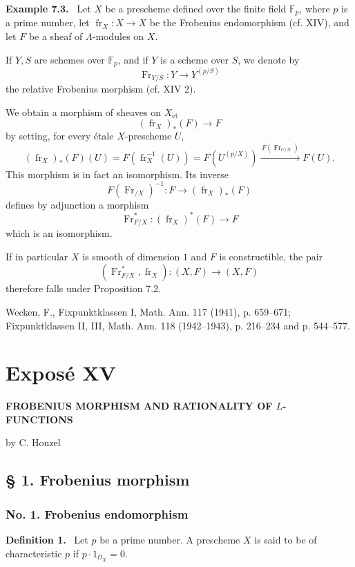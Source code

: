 \documentclass[11pt]{article}
\newenvironment{statement}[1]{\par\medskip\noindent\textbf{#1.}\ }{\par\medskip}
\providecommand{\et}{\mathrm{\acute{e}t}}
\providecommand{\OO}{\mathcal{O}}
\providecommand{\fr}{\operatorname{fr}}
\providecommand{\Fr}{\operatorname{Fr}}
\begin{document}
\begin{statement}{Example 7.3}
Let $X$ be a prescheme defined over the finite field $\mathbb F_p$, where $p$ is a prime number, let $\fr_X:X\to X$ be the Frobenius endomorphism (cf. XIV), and let $F$ be a sheaf of $\Lambda$-modules on $X$.

If $Y,S$ are schemes over $\mathbb F_p$, and if $Y$ is a scheme over $S$, we denote by
\[
\Fr_{Y/S}:Y\longrightarrow Y^{(p/S)}
\]
the relative Frobenius morphism (cf. XIV 2).

We obtain a morphism of sheaves on $X_{\et}$
\[
(\fr_X)_*(F)\longrightarrow F
\]
by setting, for every étale $X$-prescheme $U$,
\[
(\fr_X)_*(F)(U)=F(\fr_X^{-1}(U))=F(U^{(p/X)})
 \xrightarrow{\,F(\Fr_{U/X})\,}F(U).
\]
This morphism is in fact an isomorphism. Its inverse
\[
F(\Fr_{/X})^{-1}:F\longrightarrow (\fr_X)_*(F)
\]
defines by adjunction a morphism
\[
\Fr_{F/X}^*:(\fr_X)^*(F)\longrightarrow F
\]
which is an isomorphism.

If in particular $X$ is smooth of dimension $1$ and $F$ is constructible, the pair
\[
(\Fr_{F/X}^*,\fr_X):(X,F)\longrightarrow (X,F)
\]
therefore falls under Proposition 7.2.
\end{statement}

\noindent[1] Wecken, F., Fixpunktklassen I, Math. Ann. 117 (1941), p. 659--671; Fixpunktklassen II, III, Math. Ann. 118 (1942--1943), p. 216--234 and p. 544--577.

\section*{Exposé XV}
\begin{center}
\Large\bfseries FROBENIUS MORPHISM AND RATIONALITY OF $L$-FUNCTIONS

\medskip
by C. Houzel
\end{center}

\subsection*{§ 1. Frobenius morphism}

\subsubsection*{No. 1. Frobenius endomorphism}

\begin{statement}{Definition 1}
Let $p$ be a prime number. A prescheme $X$ is said to be of characteristic $p$ if $p\cdot 1_{\OO_X}=0$.
\end{statement}
\end{document}
